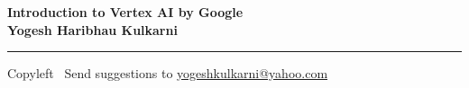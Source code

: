 
\graphicspath{{images/}}

\footnotesize


\begin{center}
\Large{\textbf{Introduction to Vertex AI by Google\\ Yogesh Haribhau Kulkarni}}  
\end{center}

\begin{multicols}{2}

\end{multicols}

\rule{\linewidth}{0.25pt}
\scriptsize
Copyleft \textcopyleft\  Send suggestions to 
\href{http://www.yogeshkulkarni.com}{yogeshkulkarni@yahoo.com}


